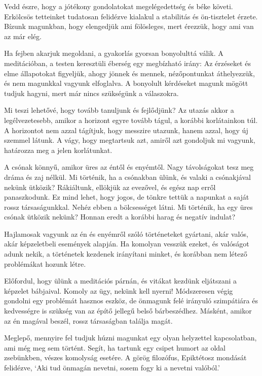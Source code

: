 Vedd észre, hogy a jótékony gondolatokat megelégedettség és béke követi.
Erkölcsös tetteinket tudatosan felidézve kialakul a stabilitás és
ön-tisztelet érzete. Bízunk magunkban, hogy elengedjük ami fölösleges,
mert érezzük, hogy ami van az már elég.

Ha fejben akarjuk megoldani, a gyakorlás gyorsan bonyolulttá válik. A
meditációban, a testen keresztüli éberség egy megbízható irány: Az
érzéseket és elme állapotokat figyeljük, ahogy jönnek és mennek,
nézőpontunkat áthelyezzük, és nem magunkkal vagyunk elfoglalva. A
bonyolult kérdéseket magunk mögött tudjuk hagyni, mert már nincs
szükségünk a válaszokra.


Mi teszi lehetővé, hogy tovább tanuljunk és fejlődjünk? Az utazás akkor
a legélvezetesebb, amikor a horizont egyre tovább tágul, a korábbi
korlátainkon túl. A horizontot nem azzal tágítjuk, hogy messzire
utazunk, hanem azzal, hogy új szemmel látunk. A vágy, hogy megtartsuk
azt, amiről azt gondoljuk mi vagyunk, határozza meg a jelen korlátunkat.

A csónak könnyű, amikor üres az éntől és enyémtől. Nagy távolságokat
tesz meg dráma és zaj nélkül. Mi történik, ha a csónakban ülünk, és
valaki a csónakjával nekünk ütközik? Rákiáltunk, ellökjük az evezővel,
és egész nap erről panaszkodunk. Ez mind lehet, hogy jogos, de tönkre
tettük a napunkat a saját rossz társaságunkkal. Nehéz ebben a
bölcsességet látni. Mi történik, ha egy üres csónak ütközik nekünk?
Honnan eredt a korábbi harag és negatív indulat?

Hajlamosak vagyunk az én és enyémről szóló történeteket gyártani, akár
valós, akár képzeletbeli események alapján. Ha komolyan vesszük ezeket,
és valóságot adunk nekik, a történetek kezdenek irányítani minket, és
korábban nem létező problémákat hozunk létre.

\enlargethispage*{\baselineskip}

Előfordul, hogy ülünk a meditációs párnán, és vitákat kezdünk eljátszani
a képzelet bábjaival. Komoly az ügy, nekünk kell nyerni! Módszeresen
végig gondolni egy problémát hasznos eszköz, de önmagunk felé irányuló
szimpátiára és kedvességre is szükség van az építő jellegű belső
bárbeszédhez. Másként, amikor az én magával beszél, rossz társaságban
találja magát.


Meglepő, mennyire fel tudjuk húzni magunkat egy olyan helyzettel
kapcsolatban, ami még meg sem történt. Segít, ha tartunk egy csipet
humort az oldal zsebünkben, vészes komolyság esetére. A görög filozófus,
Epiktétosz mondását felidézve, `Aki tud önmagán nevetni, sosem fogy ki a
nevetni valóból.'

